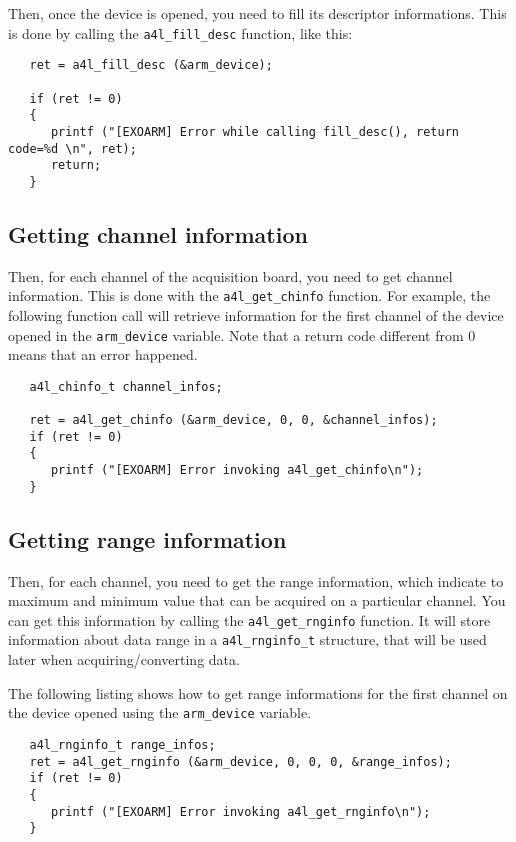 \documentclass[11pt]{book}
\begin{document}
   Then, once the device is opened, you need to fill its descriptor
   informations. This is done by calling the \texttt{a4l\_fill\_desc} function,
   like this:
   \begin{lstlisting}
   ret = a4l_fill_desc (&arm_device);

   if (ret != 0)
   {
      printf ("[EXOARM] Error while calling fill_desc(), return code=%d \n", ret);
      return;
   }
   \end{lstlisting}


   \subsection{Getting channel information}
   Then, for each channel of the acquisition board, you need to get channel
   information. This is done with the \texttt{a4l\_get\_chinfo} function. For
   example, the following function call will retrieve information for the first
   channel of the device opened in the \texttt{arm\_device} variable. Note that
   a return code different from 0 means that an error happened.

   \begin{lstlisting}
   a4l_chinfo_t channel_infos;

   ret = a4l_get_chinfo (&arm_device, 0, 0, &channel_infos);
   if (ret != 0)
   {
      printf ("[EXOARM] Error invoking a4l_get_chinfo\n");
   }
   \end{lstlisting}


   \subsection{Getting range information}
   Then, for each channel, you need to get the range information, which indicate
   to maximum and minimum value that can be acquired on a particular channel.
   You can get this information by calling the \texttt{a4l\_get\_rnginfo}
   function. It will store information about data range in a
   \texttt{a4l\_rnginfo\_t} structure, that will be used later when
   acquiring/converting data.

   The following listing shows how to get range informations for the first
   channel on the device opened using the \texttt{arm\_device} variable. 

   \begin{lstlisting}
   a4l_rnginfo_t range_infos;
   ret = a4l_get_rnginfo (&arm_device, 0, 0, 0, &range_infos);
   if (ret != 0)
   {
      printf ("[EXOARM] Error invoking a4l_get_rnginfo\n");
   }
   \end{lstlisting}
\end{document}
